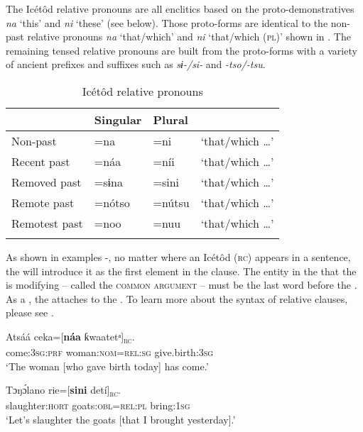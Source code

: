The Icétôd relative pronouns are all enclitics based on the proto-demonstratives \textit{na} ‘this’ and \textit{ni} ‘these’ (see  below). Those proto-forms are identical to the non-past relative pronouns \textit{na} ‘that/which’ and \textit{ni} ‘that/which (\textsc{pl})’ shown in . The remaining tensed relative pronouns are built from the proto-forms with a variety of ancient prefixes and suffixes such as \textit{sɨ-/si-} and \textit{-tso/-tsu}.


\begin{table}
\caption{Icétôd relative pronouns}
\label{tab:pro:rel}


\begin{tabularx}{\textwidth}{XXXX}
\lsptoprule

& Singular & Plural & \\
\midrule
Non-past & =na & =ni & ‘that/which {\dots}’\\
Recent past & =náa & =níi & ‘that/which {\dots}’\\
Removed past & =sɨna & =sini & ‘that/which {\dots}’\\
Remote past & =nótso & =nútsu & ‘that/which {\dots}’\\
Remotest past & =noo & =nuu & ‘that/which {\dots}’\\
\lspbottomrule
\end{tabularx}
\end{table}
As shown in examples -, no matter where an Icétôd  (\textsc{rc}) appears in a sentence, the  will introduce it as the first element in the clause. The entity in the  that the  is modifying – called the \textsc{common argument} – must be the last word before the . As a , the  attaches to the . To learn more about the syntax of relative clauses, please see .




\ea\label{ex:pro:3}
\gll Atsáá     ceka=[\textbf{náa}       ƙwaatetᵃ]\textsc{\textsubscript{rc}}. \\
come:\textsc{3sg:prf}   woman:\textsc{nom}=\textsc{rel:sg} give.birth:\textsc{3sg}    \\
\glt ‘The woman [who gave birth today] has come.’ 
\z




\ea\label{ex:pro:4}
\gll Tɔŋ\'{ɔ}lano     rie=[\textbf{sini}     detí]\textsc{\textsubscript{rc}}. \\
slaughter:\textsc{hort}   goats:\textsc{obl}=\textsc{rel:pl}   bring:\textsc{1sg}    \\
\glt ‘Let’s slaughter the goats [that I brought yesterday].’ 
\z






